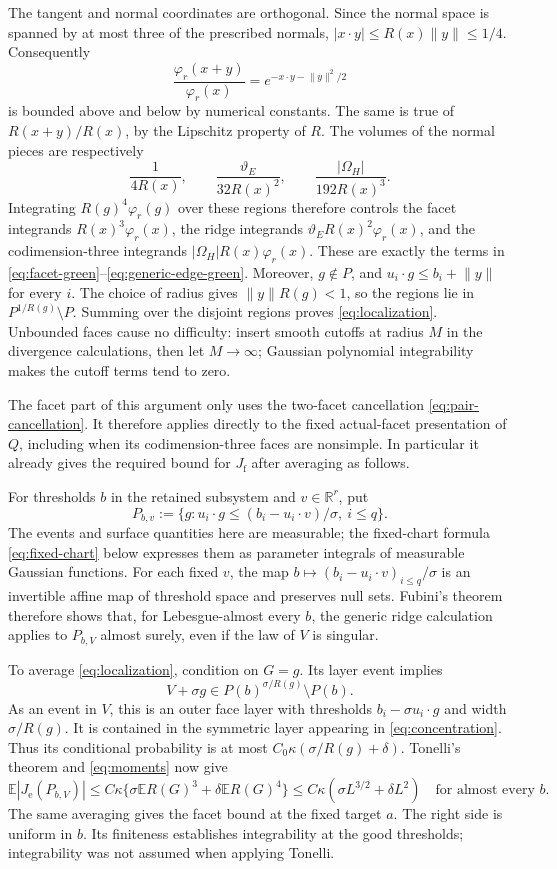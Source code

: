 \documentclass[11pt]{article}
\newcommand{\R}{\mathbb R}
\newcommand{\E}{\mathbb E}
\newcommand{\norm}[1]{\lVert #1\rVert}
\newcommand{\Jf}{J_{\mathrm f}}
\newcommand{\Je}{J_{\mathrm e}}
\begin{document}
The tangent and normal coordinates are orthogonal. Since the normal
space is spanned by at most three of the prescribed normals,
$|x\cdot y|\le R(x)\norm y\le1/4$. Consequently
\[
 \frac{\varphi_r(x+y)}{\varphi_r(x)}
 =e^{-x\cdot y-\norm y^2/2}
\]
is bounded above and below by numerical constants. The same is true
of $R(x+y)/R(x)$, by the Lipschitz property of $R$. The volumes of
the normal pieces are respectively
\[
 \frac1{4R(x)},\qquad
 \frac{\vartheta_E}{32R(x)^2},\qquad
 \frac{|\Omega_H|}{192R(x)^3}.
\]
Integrating $R(g)^4\varphi_r(g)$ over these regions therefore controls
the facet integrands $R(x)^3\varphi_r(x)$, the ridge integrands
$\vartheta_E R(x)^2\varphi_r(x)$, and the codimension-three
integrands $|\Omega_H|R(x)\varphi_r(x)$. These are exactly the
terms in \eqref{eq:facet-green}--\eqref{eq:generic-edge-green}.
Moreover, $g\notin P$, and
$u_i\cdot g\le b_i+\norm y$ for every $i$. The choice of radius gives
$\norm y R(g)<1$, so the regions lie in
$P^{1/R(g)}\setminus P$. Summing over the disjoint regions proves
\eqref{eq:localization}. Unbounded faces cause no difficulty: insert
smooth cutoffs at radius $M$ in the divergence calculations, then let
$M\to\infty$; Gaussian polynomial integrability makes the cutoff
terms tend to zero.

The facet part of this argument only uses the two-facet cancellation
\eqref{eq:pair-cancellation}. It therefore applies directly to the
fixed actual-facet presentation of $Q$, including when its
codimension-three faces are nonsimple. In particular it already gives
the required bound for $\Jf$ after averaging as follows.

For thresholds $b$ in the retained subsystem and $v\in\R^r$, put
\[
 P_{b,v}:=\{g:u_i\cdot g\le(b_i-u_i\cdot v)/\sigma,\ i\le q\}.
\]
The events and surface quantities here are measurable; the fixed-chart
formula \eqref{eq:fixed-chart} below expresses them as parameter
integrals of measurable Gaussian functions.
For each fixed $v$, the map
$b\mapsto(b_i-u_i\cdot v)_{i\le q}/\sigma$ is an invertible affine
map of threshold space and preserves null sets. Fubini's theorem
therefore shows that, for Lebesgue-almost every $b$, the generic
ridge calculation applies to $P_{b,V}$ almost surely, even if the law
of $V$ is singular.

To average \eqref{eq:localization}, condition on $G=g$. Its layer event
implies
\[
 V+\sigma g\in P(b)^{\sigma/R(g)}\setminus P(b).
\]
As an event in $V$, this is an outer face layer with thresholds
$b_i-\sigma u_i\cdot g$ and width $\sigma/R(g)$. It is contained in
the symmetric layer appearing in \eqref{eq:concentration}. Thus its
conditional probability is at most
$C_0\kappa(\sigma/R(g)+\delta)$. Tonelli's theorem and
\eqref{eq:moments} now give
\begin{equation}\label{eq:averaged-generic}
 \E|\Je(P_{b,V})|
 \le C\kappa\{\sigma\E R(G)^3+\delta\E R(G)^4\}
 \le C\kappa(\sigma L^{3/2}+\delta L^2)
 \quad\text{for almost every }b.
\end{equation}
The same averaging gives the facet bound at the fixed target $a$.
The right side is uniform in $b$. Its finiteness establishes
integrability at the good thresholds; integrability was not assumed
when applying Tonelli.
\end{document}
